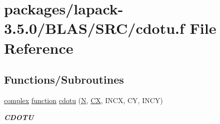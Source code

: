 \hypertarget{lapack-3_85_80_2BLAS_2SRC_2cdotu_8f}{}\section{packages/lapack-\/3.5.0/\+B\+L\+A\+S/\+S\+R\+C/cdotu.f File Reference}
\label{lapack-3_85_80_2BLAS_2SRC_2cdotu_8f}
\subsection*{Functions/\+Subroutines}
\begin{DoxyCompactItemize}
\item 
\hyperlink{structcomplex}{complex} \hyperlink{afunc_8m_a7b5e596df91eadea6c537c0825e894a7}{function} \hyperlink{group__complex__blas__level1_gadd72f1b633553acc77250e32bc704a78}{cdotu} (\hyperlink{polmisc_8c_a0240ac851181b84ac374872dc5434ee4}{N}, \hyperlink{scsum1_8c_a5a76da95c549c41790389a76e12fdcb5}{C\+X}, I\+N\+C\+X, C\+Y, I\+N\+C\+Y)
\begin{DoxyCompactList}\small\item\em {\bfseries C\+D\+O\+T\+U} \end{DoxyCompactList}\end{DoxyCompactItemize}
